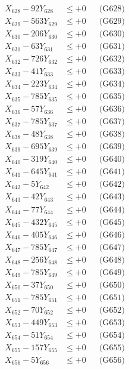 \documentclass[a4paper,10pt]{article}
\begin{document}
{\begin{align}
X_{628} - 92Y_{628} &\leq +0 && \text{(G628)} \\
X_{629} - 563Y_{629} &\leq +0 && \text{(G629)} \\
X_{630} - 206Y_{630} &\leq +0 && \text{(G630)} \\
\allowbreak
X_{631} - 63Y_{631} &\leq +0 && \text{(G631)} \\
X_{632} - 726Y_{632} &\leq +0 && \text{(G632)} \\
X_{633} - 41Y_{633} &\leq +0 && \text{(G633)} \\
X_{634} - 223Y_{634} &\leq +0 && \text{(G634)} \\
X_{635} - 785Y_{635} &\leq +0 && \text{(G635)} \\
X_{636} - 57Y_{636} &\leq +0 && \text{(G636)} \\
X_{637} - 785Y_{637} &\leq +0 && \text{(G637)} \\
X_{638} - 48Y_{638} &\leq +0 && \text{(G638)} \\
X_{639} - 695Y_{639} &\leq +0 && \text{(G639)} \\
X_{640} - 319Y_{640} &\leq +0 && \text{(G640)} \\
\allowbreak
X_{641} - 645Y_{641} &\leq +0 && \text{(G641)} \\
X_{642} - 5Y_{642} &\leq +0 && \text{(G642)} \\
X_{643} - 42Y_{643} &\leq +0 && \text{(G643)} \\
X_{644} - 77Y_{644} &\leq +0 && \text{(G644)} \\
X_{645} - 432Y_{645} &\leq +0 && \text{(G645)} \\
X_{646} - 405Y_{646} &\leq +0 && \text{(G646)} \\
X_{647} - 785Y_{647} &\leq +0 && \text{(G647)} \\
X_{648} - 256Y_{648} &\leq +0 && \text{(G648)} \\
X_{649} - 785Y_{649} &\leq +0 && \text{(G649)} \\
X_{650} - 37Y_{650} &\leq +0 && \text{(G650)} \\
\allowbreak
X_{651} - 785Y_{651} &\leq +0 && \text{(G651)} \\
X_{652} - 70Y_{652} &\leq +0 && \text{(G652)} \\
X_{653} - 449Y_{653} &\leq +0 && \text{(G653)} \\
X_{654} - 51Y_{654} &\leq +0 && \text{(G654)} \\
X_{655} - 157Y_{655} &\leq +0 && \text{(G655)} \\
X_{656} - 5Y_{656} &\leq +0 && \text{(G656)} \\

\end{align}}
\end{document}
